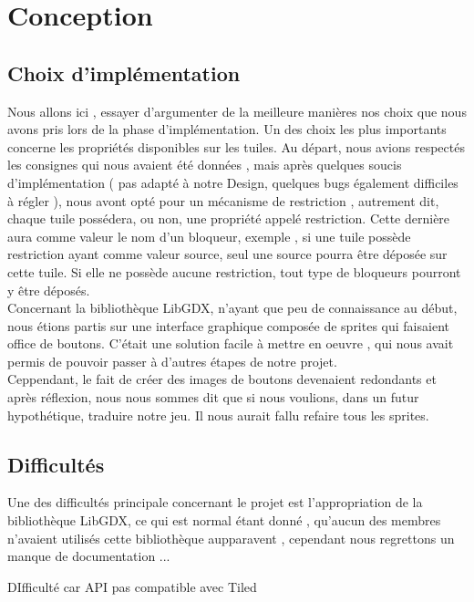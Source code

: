 \documentclass[a4paper,10pt]{article}
\begin{document}
\section{Conception}
\subsection{Choix d'implémentation}
Nous allons ici , essayer d'argumenter de la meilleure manières nos choix que nous avons pris lors de la phase d'implémentation.
Un des choix les plus importants concerne les propriétés disponibles sur les tuiles. Au départ, nous avions respectés les consignes qui nous
avaient été données , mais après quelques soucis d'implémentation ( pas adapté à notre Design, quelques bugs également difficiles à régler ), nous
avont opté pour un mécanisme de restriction , autrement dit, chaque tuile possédera, ou non, une propriété appelé restriction. Cette dernière aura
comme valeur le nom d'un bloqueur, exemple , si une tuile possède restriction ayant comme valeur source, seul une source pourra être déposée sur cette tuile.
Si elle ne possède aucune restriction, tout type de bloqueurs pourront y être déposés. 
\\
Concernant la bibliothèque LibGDX, n'ayant que peu de connaissance au début, nous étions partis sur une interface graphique composée de sprites qui faisaient
office de boutons. C'était une solution facile à mettre en oeuvre , qui nous avait permis de pouvoir passer à d'autres étapes de notre projet.\\
Ceppendant, le fait de créer des images de boutons devenaient redondants et après réflexion, nous nous sommes dit que si nous voulions, dans un futur
hypothétique, traduire notre jeu. Il nous aurait fallu refaire tous les sprites. 
\subsection{Difficultés}
Une des difficultés principale concernant le projet est l'appropriation de la bibliothèque LibGDX, ce qui est normal étant donné , qu'aucun des membres
n'avaient utilisés cette bibliothèque aupparavent , cependant nous regrettons un manque de documentation ...

DIfficulté car API pas compatible avec Tiled 
\end{document}
